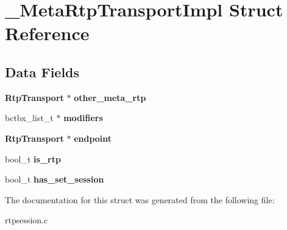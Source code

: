 \section{\+\_\+\+Meta\+Rtp\+Transport\+Impl Struct Reference}
\label{struct__MetaRtpTransportImpl}
\subsection*{Data Fields}
\begin{DoxyCompactItemize}
\item 
\mbox{\label{struct__MetaRtpTransportImpl_a0681ce23b571170883399f0732a1d6ba}} 
\textbf{ Rtp\+Transport} $\ast$ {\bfseries other\+\_\+meta\+\_\+rtp}
\item 
\mbox{\label{struct__MetaRtpTransportImpl_a0df3f449c099a001b131f1c0acdc69d0}} 
bctbx\+\_\+list\+\_\+t $\ast$ {\bfseries modifiers}
\item 
\mbox{\label{struct__MetaRtpTransportImpl_a0ffdd2817af7b660ac6af1316bae4036}} 
\textbf{ Rtp\+Transport} $\ast$ {\bfseries endpoint}
\item 
\mbox{\label{struct__MetaRtpTransportImpl_af6283708aa38a6f4544a2734cd255dda}} 
bool\+\_\+t {\bfseries is\+\_\+rtp}
\item 
\mbox{\label{struct__MetaRtpTransportImpl_abaa8a40ec68a6eb27fe87159894d9996}} 
bool\+\_\+t {\bfseries has\+\_\+set\+\_\+session}
\end{DoxyCompactItemize}


The documentation for this struct was generated from the following file\+:\begin{DoxyCompactItemize}
\item 
rtpsession.\+c\end{DoxyCompactItemize}

